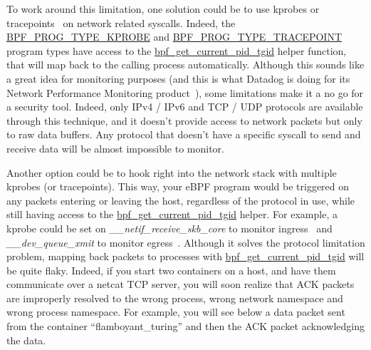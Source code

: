 To work around this limitation, one solution could be to use kprobes or tracepoints~\cite{ProcessLevelNetworkSecurityMonitoring:KernelProbesDoc} on network related syscalls. Indeed, the \url{BPF_PROG_TYPE_KPROBE} and \url{BPF_PROG_TYPE_TRACEPOINT} program types have access to the \url{bpf_get_current_pid_tgid} helper function, that will map back to the calling process automatically. Although this sounds like a great idea for monitoring purposes (and this is what Datadog is doing for its Network Performance Monitoring product~\cite{ProcessLevelNetworkSecurityMonitoring:MichaelGerstenhaber}), some limitations make it a no go for a security tool. Indeed, only IPv4 / IPv6 and TCP / UDP protocols are available through this technique, and it doesn’t provide access to network packets but only to raw data buffers. Any protocol that doesn’t have a specific syscall to send and receive data will be almost impossible to monitor.

Another option could be to hook right into the network stack with multiple kprobes (or tracepoints). This way, your eBPF program would be triggered on any packets entering or leaving the host, regardless of the protocol in use, while still having access to the \url{bpf_get_current_pid_tgid} helper. For example, a kprobe could be set on \emph{\_\_netif\_receive\_skb\_core} to monitor ingress~\cite{ProcessLevelNetworkSecurityMonitoring:PackagecloudReceiving} and \emph{\_\_dev\_queue\_xmit} to monitor egress~\cite{ProcessLevelNetworkSecurityMonitoring:PackagecloudSending}. Although it solves the protocol limitation problem, mapping back packets to processes with \url{bpf_get_current_pid_tgid} will be quite flaky. Indeed, if you start two containers on a host, and have them communicate over a netcat TCP server, you will soon realize that ACK packets are improperly resolved to the wrong process, wrong network namespace and wrong process namespace. For example, you will see below a data packet sent from the container “flamboyant\_turing” and then the ACK packet acknowledging the data.


